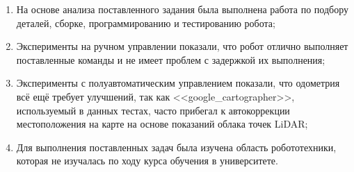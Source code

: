 \begin{enumerate}
  \item На основе анализа поставленного задания была выполнена работа по подбору деталей, сборке, программированию и тестированию робота;
  \item Эксперименты на ручном управлении показали, что робот отлично выполняет поставленные команды и не имеет проблем с задержкой их выполнения;
  \item Эксперименты с полуавтоматическим управлением показали, что одометрия всё ещё требует улучшений, так как <<google\_cartographer>>, используемый в данных тестах, часто прибегал к автокоррекции местоположения на карте на основе показаний облака точек LiDAR;
  \item Для выполнения поставленных задач была изучена область робототехники, которая не изучалась по ходу курса обучения в университете. 
\end{enumerate}
